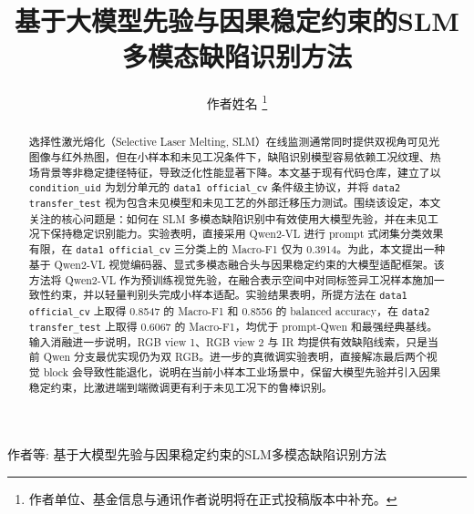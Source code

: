 \documentclass[lettersize,journal]{IEEEtran}
\begin{document}
\title{基于大模型先验与因果稳定约束的SLM多模态缺陷识别方法}

\author{作者姓名
\thanks{作者单位、基金信息与通讯作者说明将在正式投稿版本中补充。}}

%
{作者等: 基于大模型先验与因果稳定约束的SLM多模态缺陷识别方法}

\maketitle

\begin{abstract}
选择性激光熔化（Selective Laser Melting, SLM）在线监测通常同时提供双视角可见光图像与红外热图，但在小样本和未见工况条件下，缺陷识别模型容易依赖工况纹理、热场背景等非稳定捷径特征，导致泛化性能显著下降。本文基于现有代码仓库，建立了以 \texttt{condition\_uid} 为划分单元的 \texttt{data1 official\_cv} 条件级主协议，并将 \texttt{data2 transfer\_test} 视为包含未见模型和未见工艺的外部迁移压力测试。围绕该设定，本文关注的核心问题是：如何在 SLM 多模态缺陷识别中有效使用大模型先验，并在未见工况下保持稳定识别能力。实验表明，直接采用 Qwen2-VL 进行 prompt 式闭集分类效果有限，在 \texttt{data1 official\_cv} 三分类上的 Macro-F1 仅为 0.3914。为此，本文提出一种基于 Qwen2-VL 视觉编码器、显式多模态融合头与因果稳定约束的大模型适配框架。该方法将 Qwen2-VL 作为预训练视觉先验，在融合表示空间中对同标签异工况样本施加一致性约束，并以轻量判别头完成小样本适配。实验结果表明，所提方法在 \texttt{data1 official\_cv} 上取得 0.8547 的 Macro-F1 和 0.8556 的 balanced accuracy，在 \texttt{data2 transfer\_test} 上取得 0.6067 的 Macro-F1，均优于 prompt-Qwen 和最强经典基线。输入消融进一步说明，RGB view 1、RGB view 2 与 IR 均提供有效缺陷线索，只是当前 Qwen 分支最优实现仍为双 RGB。进一步的真微调实验表明，直接解冻最后两个视觉 block 会导致性能退化，说明在当前小样本工业场景中，保留大模型先验并引入因果稳定约束，比激进端到端微调更有利于未见工况下的鲁棒识别。
\end{abstract}
\end{document}
